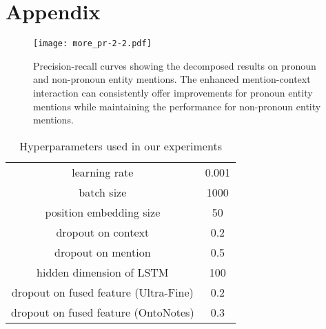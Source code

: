 \documentclass[11pt,a4paper]{article}
\begin{document}



\appendix
\clearpage
\onecolumn
\section{Appendix}
\begin{figure*}[h]
    \centering
    \texttt{[image: more\_pr-2-2.pdf]}
    \caption{Precision-recall curves showing the decomposed results on pronoun and non-pronoun entity mentions. The enhanced mention-context interaction can consistently offer improvements for pronoun entity mentions while maintaining the performance for non-pronoun entity mentions.}
    \label{fig:more}
\end{figure*}

\begin{table*}[h]
\small
    \centering
    \begin{tabular}{c|c}
    \toprule
        learning rate & 0.001 \\
        batch size & 1000 \\
        position embedding size & 50 \\
        dropout on context  & 0.2 \\
        dropout on mention  & 0.5 \\
        hidden dimension of LSTM & 100 \\ 
        dropout on fused feature  (Ultra-Fine) & 0.2 \\
        dropout on fused feature  (OntoNotes) & 0.3\\
    \bottomrule
    \end{tabular}
    \caption{Hyperparameters used in our experiments}
    \label{tab:hyperparamters}
\end{table*}
\end{document}
